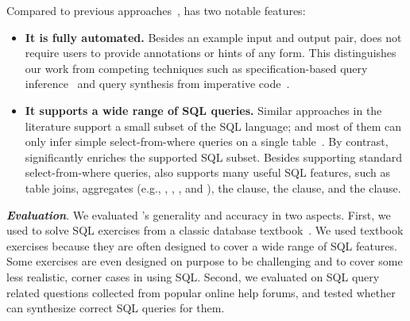 Compared to previous approaches~\cite{Zloof:1975,
Tran:2009, DasSarma:2010, abs-1208-2013}, \ourtool has two notable features:

\begin{itemize}
\item \textbf{It is fully automated.} Besides
an example input and output pair,
\ourtool does not require users to provide
annotations or hints of any form. 
This distinguishes our work from competing techniques such as
specification-based query inference~\cite{Zloof:1975} and
query synthesis from imperative code~\cite{abs-1208-2013}.

\item \textbf{It supports a wide range of SQL queries.}
Similar approaches in the literature support
a small subset of the SQL language; and most of them
can only infer simple select-from-where
queries on a single table~\cite{Zloof:1975, Tran:2009, DasSarma:2010, abs-1208-2013}. By contrast, 
\ourtool significantly enriches the supported SQL subset.
Besides supporting standard select-from-where
queries, \ourtool also supports many useful
SQL features, such as table joins,
aggregates (e.g., , , ,
and ), the  clause,
the  clause, and the  clause.
\end{itemize}






\vspace{1mm}
\noindent \textbf{\textit{Evaluation}}.
We evaluated \ourtool's generality and accuracy
in two aspects. First, we used \ourtool to solve
\exnum SQL exercises from a classic database textbook~\cite{cowbook}. 
We used textbook exercises because they
are often designed to cover a wide range of SQL features.
Some exercises are even designed on purpose
to be challenging and to cover some less realistic,
corner cases in using SQL.
Second, we evaluated \ourtool on \pnum SQL query related
questions collected from popular online help forums, and tested whether
\ourtool can synthesize correct SQL queries for them.

